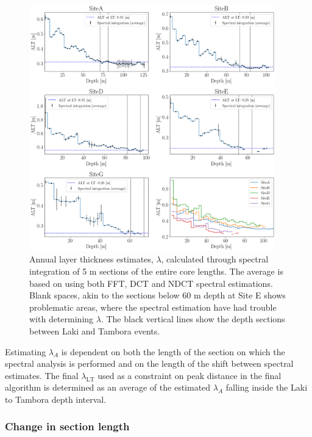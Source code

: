 \documentclass[../../CompleteThesis2/Complete_2ndDraft]{subfiles}
\begin{document}
\begin{figure}[h]
	\centering
	\includegraphics[width=0.95\textwidth]{AllCores_ALTs.png}
	\caption[$\lambda$ for Full Cores]{\small Annual layer thickness estimates, $\lambda$, calculated through spectral integration of 5 m sections of the entire core lengths. The average is based on using both FFT, DCT and NDCT spectral estimations. Blank spaces, akin to the sections below 60 m depth at Site E shows problematic areas, where the spectral estimation have had trouble with determining $\lambda$. The black vertical lines show the depth sections between Laki and Tambora events.}
	\label{fig:AllCores_ALT_l5_s4}
\end{figure}

Estimating $\lambda_A$ is dependent on both the length of the section on which the spectral analysis is performed and on the length of the shift between spectral estimates. The final $\lambda_{\text{LT}}$ used as a constraint on peak distance in the final algorithm is determined as an average of the estimated $\lambda_A$ falling inside the Laki to Tambora depth interval.

\subsubsection[Change in $l_{sec}$]{Change in section length}
\label{Subsubsec:SignalAnalysis_SpectralAnalysis_ALT_lsec}
\end{document}
